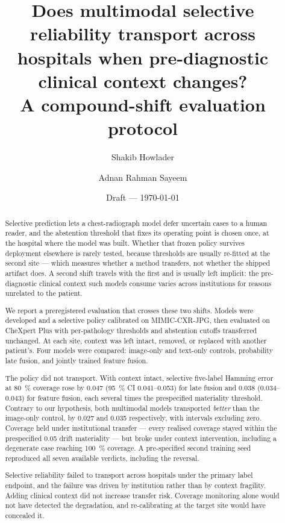 \documentclass[11pt,a4paper]{article}
\title{Does multimodal selective reliability transport across hospitals when
pre-diagnostic clinical context changes?\\
\large A compound-shift evaluation protocol}
\author{Shakib Howlader}
\author{Adnan Rahman Sayeem}
\affil{Daffodil International University}
\date{Draft --- \today}
\begin{document}
\maketitle

\begin{abstract}
\noindent
Selective prediction lets a chest-radiograph model defer uncertain cases to a
human reader, and the abstention threshold that fixes its operating point is
chosen once, at the hospital where the model was built. Whether that frozen
policy survives deployment elsewhere is rarely tested, because thresholds are
usually re-fitted at the second site --- which measures whether a method
transfers, not whether the shipped artifact does. A second shift travels with
the first and is usually left implicit: the pre-diagnostic clinical context such
models consume varies across institutions for reasons unrelated to the patient.

We report a preregistered evaluation that crosses these two shifts. Models were
developed and a selective policy calibrated on MIMIC-CXR-JPG, then evaluated on
CheXpert Plus with per-pathology thresholds and abstention cutoffs transferred
unchanged. At each site, context was left intact, removed, or replaced with
another patient's. Four models were compared: image-only and text-only controls,
probability late fusion, and jointly trained feature fusion.

The policy did not transport. With context intact, selective five-label Hamming
error at \SI{80}{\percent} coverage rose by \num{0.047} (\SI{95}{\percent} CI
\numrange{0.041}{0.053}) for late fusion and \num{0.038}
(\numrange{0.034}{0.043}) for feature fusion, each several times the
prespecified materiality threshold. Contrary to our hypothesis, both multimodal
models transported \emph{better} than the image-only control, by \num{0.027} and
\num{0.035} respectively, with intervals excluding zero. Coverage held under
institutional transfer --- every realised coverage stayed within the
prespecified \num{0.05} drift materiality --- but broke under context
intervention, including a degenerate case reaching \SI{100}{\percent} coverage.
A pre-specified second training seed reproduced all seven available verdicts,
including the reversal.

Selective reliability failed to transport across hospitals under the primary
label endpoint, and the failure was driven by institution rather than by context
fragility. Adding clinical context did not increase transfer risk. Coverage
monitoring alone would not have detected the degradation, and re-calibrating at
the target site would have concealed it.


\end{abstract}
\end{document}
